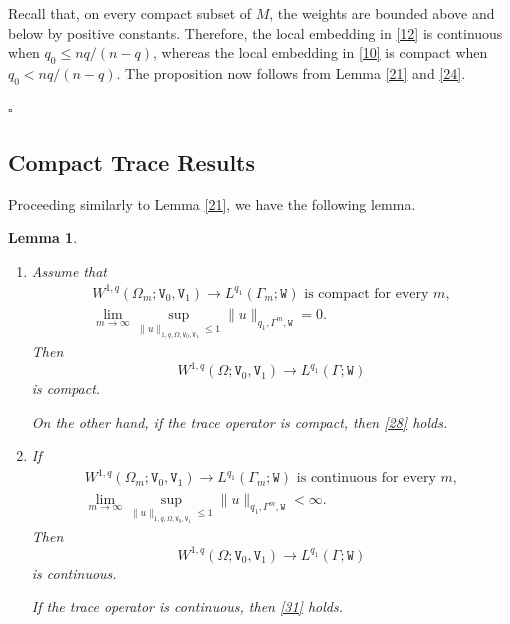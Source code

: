 \documentclass[reqno, 11pt, a4paper]{amsart}
\newtheorem{lemma}[theorem]{Lemma}
\numberwithin{equation}{section}
\newcommand{\ds}{\textnormal{d}\sigma}
\newcommand{\dsg}{\textnormal{d}\sigma _g}
\newcommand{\gij}{\textnormal{a}  \textnormal{b}}
\newcommand{\wghtv}{\mathtt{V}}
\newcommand{\wghtw}{\mathtt{W}}
\newcommand{\qxp}{q}
\begin{document}
Recall that, on every compact subset of $M$, the weights are bounded above and below by positive constants. Therefore, the local embedding in \eqref{12} is continuous when $\qxp_0\leq n\qxp/(n-\qxp)$, whereas the local embedding in \eqref{10} is compact when $\qxp_0<n\qxp/(n-\qxp)$. The proposition now follows from Lemma \ref{21} and \eqref{24}.


\begin{flushright}
$\square$
\end{flushright}

\subsection{Compact Trace Results}
Proceeding similarly to Lemma \ref{21}, we have the following lemma.
\begin{lemma} \label{25}
$ $
\begin{enumerate}[label=(\roman*)]
\item \label{26} Assume that
\begin{gather}
W^{1,\qxp}(\Omega_m;\wghtv_0,\wghtv_1)\rightarrow L^{\qxp_1}(\Gamma_m;\wghtw) \text { is compact for every }m,\label{27}\\[5pt]
\lim_{m\rightarrow\infty}\sup_{\|u\|_{1,\qxp,\Omega,\wghtv_0,\wghtv_1}\leq1}\|u\|_{\qxp_1,\Gamma^m,\wghtw}=0.\label{28}
\end{gather}
Then
$$
W^{1,\qxp}(\Omega;\wghtv_0,\wghtv_1)\rightarrow L^{\qxp_1}(\Gamma;\wghtw)
$$
is compact.

On the other hand, if the trace operator is compact, then \eqref{28} holds.

\item \label{29} If
\begin{gather}
W^{1,\qxp}(\Omega_m;\wghtv_0,\wghtv_1)\rightarrow L^{\qxp_1}(\Gamma_m;\wghtw) \text { is continuous for every }m,\label{30}\\[5pt]
\lim_{m\rightarrow\infty}\sup_{\|u\|_{1,\qxp,\Omega,\wghtv_0,\wghtv_1}\leq1}\|u\|_{\qxp_1,\Gamma^m,\wghtw}<\infty.\label{31}
\end{gather}
Then
$$
W^{1,\qxp}(\Omega;\wghtv_0,\wghtv_1)\rightarrow L^{\qxp_1}(\Gamma;\wghtw)
$$
is continuous.

If the trace operator is continuous, then \eqref{31} holds.
\end{enumerate}
\end{lemma}


\end{document}
